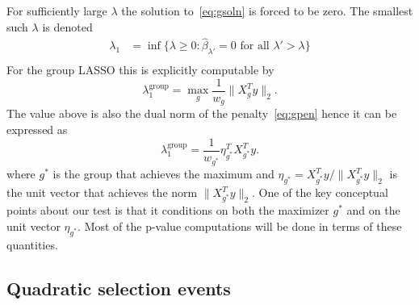\documentclass{imsart}
\begin{document}
For sufficiently large $\lambda$ the solution to~\eqref{eq:gsoln} is forced
to be zero. The smallest such $\lambda$ is denoted
\begin{equation}
  \begin{aligned}
   \lambda_1 &= \inf \{ \lambda \geq 0 : \hat \beta_{\lambda'} = 0 \text{ for all } \lambda' > \lambda \} \\
  \end{aligned}
\end{equation}
For the group LASSO this is explicitly computable by
\begin{equation}
\lambda_1^{\text{group}} = \max_{g} \frac{1}{w_g}\|X_g^Ty\|_2 . 
\end{equation}
The value above is also the dual norm of the penalty~\eqref{eq:gpen}
hence it can be expressed as
\begin{equation}
\label{eq:lammax}
\lambda_1^{\text{group}}
 = \frac{1}{w_{g^*}}\eta_{g^*}^TX_{g^*}^Ty . 
\end{equation}
where $g^*$ is the group that achieves the maximum and 
$\eta_{g^*} = X_{g^*}^Ty / \|X_{g^*}^Ty\|_2$ is the unit vector that achieves the norm $\|X_{g^*}^Ty\|_2$. One of the key conceptual points about our
test is that it conditions on both the maximizer $g^*$ and on the unit
vector $\eta_{g^*}$. Most of the p-value computations will be done in
terms of these quantities.




\subsection{Quadratic selection events}
\end{document}
